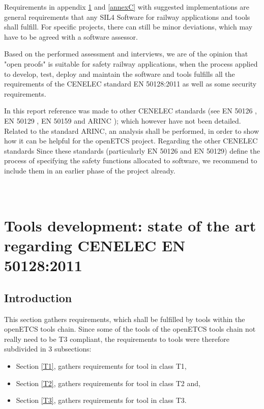 \documentclass{template/openetcs_report}
\begin{document}
Requirements in appendix \ref{annexA} and \ref{annexC} with suggested implementations are general requirements that any SIL4 Software for railway applications and tools shall fulfill. For specific projects, there can still be minor deviations, which may have to be agreed with a software assessor.

Based on the performed assessment and interviews, we are of the opinion that "open proofs" is suitable for safety railway applications, when the process applied to develop, test, deploy and maintain the software and tools fulfills all the requirements of the CENELEC standard EN 50128:2011 as well as some security requirements.

In this report reference was made to other CENELEC standards (see  EN 50126 \cite{EN50126}, EN 50129 \cite{EN50129}, EN 50159 \cite{EN50159} and ARINC \cite{ARINC}); which however have not been detailed.
Related to the standard ARINC, an analysis shall be performed, in order to show how it can be helpful for the openETCS project.
Regarding the other CENELEC standards  Since these standards (particularly EN 50126 and EN 50129) define the process of specifying the safety functions allocated to software, we recommend to include them in an earlier phase of the project already.






\nocite{*}




\appendix

\chapter{\\Tools development: state of the art regarding CENELEC EN 50128:2011}
\label{annexA}

\section{Introduction}
This section gathers requirements, which shall be fulfilled by tools within the openETCS tools chain.
Since some of the tools of the openETCS tools chain not really need to be T3 compliant, the requirements to tools were therefore subdivided in 3 subsections:
\begin{itemize}\itemsep=0pt
  \item Section \ref{T1}, gathers requirements for tool in class T1,
  \item Section \ref{T2}, gathers requirements for tool in class T2 and,
  \item Section \ref{T3}, gathers requirements for tool in class T3.
\end{itemize}
\end{document}
